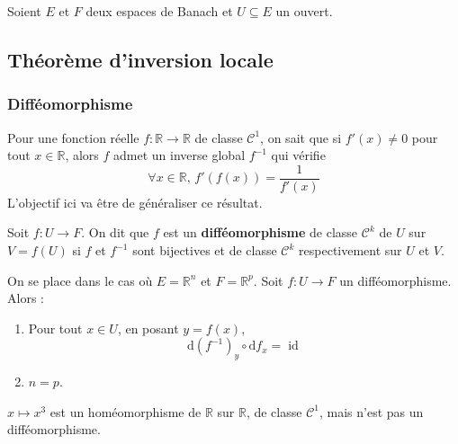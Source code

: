 




  Soient $E$ et $F$ deux espaces de Banach et $U \subseteq E$ un ouvert.

  \subsection{Théorème d'inversion locale}

  \subsubsection{Difféomorphisme}


  Pour une fonction réelle $f : \mathbb{R} \rightarrow \mathbb{R}$ de classe $\mathcal{C}^1$, on sait que si $f'(x) \neq 0$ pour tout $x \in \mathbb{R}$, alors $f$ admet un inverse global $f^{-1}$ qui vérifie
  \[ \forall x \in \mathbb{R}, \, f'(f(x)) = \frac{1}{f'(x)} \]
  L'objectif ici va être de généraliser ce résultat.


  \begin{definition}
    Soit $f : U \rightarrow F$. On dit que $f$ est un \textbf{difféomorphisme} de classe $\mathcal{C}^k$ de $U$ sur $V = f(U)$ si $f$ et $f^{-1}$ sont bijectives et de classe $\mathcal{C}^k$ respectivement sur $U$ et $V$.
  \end{definition}

  \begin{proposition}
    On se place dans le cas où $E = \mathbb{R}^n$ et $F = \mathbb{R}^p$. Soit $f : U \rightarrow F$ un difféomorphisme. Alors :
    \begin{enumerate}[label=(\roman*)]
      \item Pour tout $x \in U$, en posant $y = f(x)$,
      \[ \mathrm{d}(f^{-1})_y \circ \mathrm{d}f_x = \operatorname{id} \]
      \item $n=p$.
    \end{enumerate}
  \end{proposition}

  \begin{example}
    $x \mapsto x^3$ est un homéomorphisme de $\mathbb{R}$ sur $\mathbb{R}$, de classe $\mathcal{C}^1$, mais n'est pas un difféomorphisme.
  \end{example}

